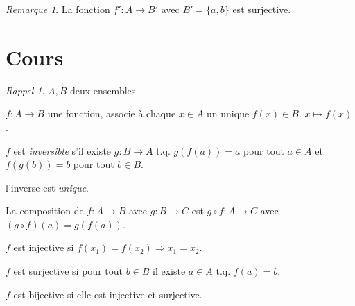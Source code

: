 \documentclass{report}
\newcounter{cours}
\newcommand*{\cours}{\section*{Cours \thecours}\stepcounter{cours}}
\theoremstyle{definition}
\theoremstyle{remark}
\newtheorem*{rema}{Remarque}
\newtheorem*{rappel}{Rappel}
\begin{document}
	\begin{rema}
		La fonction $f':A \to B'$ avec $B'=\{a,b\}$ est surjective.
	\end{rema}


	\cours
	\begin{rappel}
		$A, B$ deux ensembles

		\begin{ulist}[noitemsep]
			\item $f:A \to B$ une fonction, associe \`a chaque $x \in A$ un unique $f(x) \in B$. $x \mapsto f(x)$.
			\item $f$ est \emph{inversible} s'il existe $g:B \to A$ t.q. $g(f(a))=a$ pour tout $a \in A$ et $f(g(b))=b$ pour tout $b \in B$.
			\item l'inverse est \emph{unique}.
			\item La composition de $f:A \to B$ avec $g:B \to C$ est $g \circ f:A \to C$ avec $(g \circ f)(a)=g(f(a))$.
			\item $f$ est injective si $f(x_1)=f(x_2) \Rightarrow x_1=x_2$.
			\item $f$ est surjective si pour tout $b \in B$ il existe $a \in A$ t.q. $f(a)=b$.
			\item $f$ est bijective si elle est injective et surjective.
		\end{ulist}
	\end{rappel}
\end{document}
